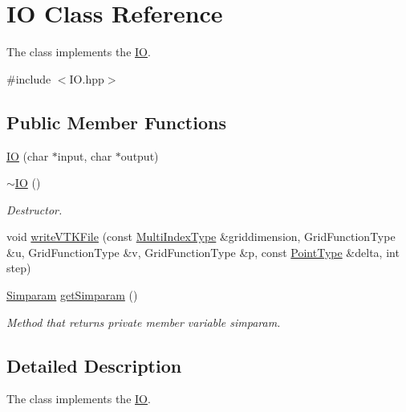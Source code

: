 \hypertarget{class_i_o}{\section{I\-O Class Reference}
\label{class_i_o}
}


The class implements the \hyperlink{class_i_o}{I\-O}.  




{\ttfamily \#include $<$I\-O.\-hpp$>$}

\subsection*{Public Member Functions}
\begin{DoxyCompactItemize}
\item 
\hyperlink{class_i_o_ac100fd32b66e2c0e1ad53fdcd15a1b99}{I\-O} (char $\ast$input, char $\ast$output)
\item 
\hypertarget{class_i_o_a44861ff225d351615179f0f24cb8d7f6}{\hyperlink{class_i_o_a44861ff225d351615179f0f24cb8d7f6}{$\sim$\-I\-O} ()}\label{class_i_o_a44861ff225d351615179f0f24cb8d7f6}

\begin{DoxyCompactList}\small\item\em Destructor. \end{DoxyCompactList}\item 
void \hyperlink{class_i_o_a8bb88500f3553e47d3cbf5e600708bae}{write\-V\-T\-K\-File} (const \hyperlink{class_array}{Multi\-Index\-Type} \&griddimension, Grid\-Function\-Type \&u, Grid\-Function\-Type \&v, Grid\-Function\-Type \&p, const \hyperlink{class_array}{Point\-Type} \&delta, int step)
\item 
\hypertarget{class_i_o_a3933f286e7fe830690785f8528d325d9}{\hyperlink{struct_simparam}{Simparam} \hyperlink{class_i_o_a3933f286e7fe830690785f8528d325d9}{get\-Simparam} ()}\label{class_i_o_a3933f286e7fe830690785f8528d325d9}

\begin{DoxyCompactList}\small\item\em Method that returns private member variable simparam. \end{DoxyCompactList}\end{DoxyCompactItemize}


\subsection{Detailed Description}
The class implements the \hyperlink{class_i_o}{I\-O}. 

